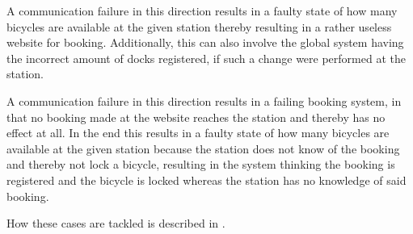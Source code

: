 \begin{description}[style=nextline]
\item[Station to Global System]
A communication failure in this direction results in a faulty state of how many bicycles are available at the given station thereby resulting in a rather useless website for booking.
Additionally, this can also involve the global system having the incorrect amount of docks registered, if such a change were performed at the station.
\item[Global System to Station]
A communication failure in this direction results in a failing booking system, in that no booking made at the website reaches the station and thereby has no effect at all.
In the end this results in a faulty state of how many bicycles are available at the given station because the station does not know of the booking and thereby not lock a bicycle, resulting in the system thinking the booking is registered and the bicycle is locked whereas the station has no knowledge of said booking.
\end{description}


How these cases are tackled is described in .
